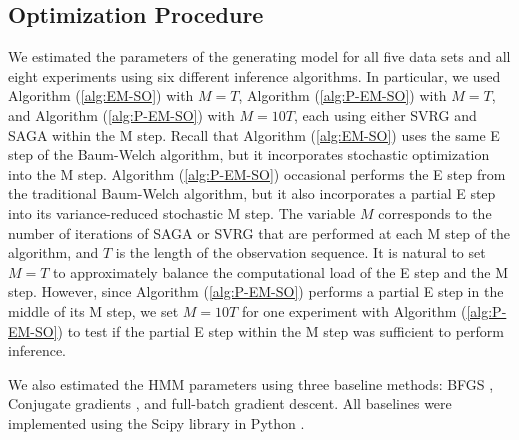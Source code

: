 \subsection{Optimization Procedure}

We estimated the parameters of the generating model for all five data sets and all eight experiments using six different inference algorithms. In particular, we used Algorithm (\ref{alg:EM-SO}) with $M=T$, Algorithm (\ref{alg:P-EM-SO}) with $M=T$, and Algorithm (\ref{alg:P-EM-SO}) with $M=10T$, each using either SVRG and SAGA within the M step. Recall that Algorithm (\ref{alg:EM-SO}) uses the same E step of the Baum-Welch algorithm, but it incorporates stochastic optimization into the M step. Algorithm (\ref{alg:P-EM-SO}) occasional performs the E step from the traditional Baum-Welch algorithm, but it also incorporates a partial E step into its variance-reduced stochastic M step. The variable $M$ corresponds to the number of iterations of SAGA or SVRG that are performed at each M step of the algorithm, and $T$ is the length of the observation sequence. It is natural to set $M=T$ to approximately balance the computational load of the E step and the M step. However, since Algorithm (\ref{alg:P-EM-SO}) performs a partial E step in the middle of its M step, we set $M=10T$ for one experiment with Algorithm (\ref{alg:P-EM-SO}) to test if the partial E step within the M step was sufficient to perform inference.

We also estimated the HMM parameters using three baseline methods: BFGS \citep{Fletcher:2000}, Conjugate gradients \citep{Fletcher:1964}, and full-batch gradient descent.
%
All baselines were implemented using the Scipy library in Python \citep{Virtanen:2019}.

